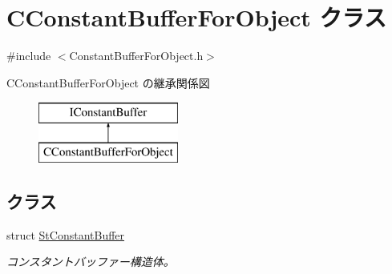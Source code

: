 \hypertarget{class_c_constant_buffer_for_object}{}\section{C\+Constant\+Buffer\+For\+Object クラス}
\label{class_c_constant_buffer_for_object}


{\ttfamily \#include $<$Constant\+Buffer\+For\+Object.\+h$>$}

C\+Constant\+Buffer\+For\+Object の継承関係図\begin{figure}[H]
\begin{center}
\leavevmode
\includegraphics[height=2.000000cm]{class_c_constant_buffer_for_object}
\end{center}
\end{figure}
\subsection*{クラス}
\begin{DoxyCompactItemize}
\item 
struct \hyperlink{struct_c_constant_buffer_for_object_1_1_st_constant_buffer}{St\+Constant\+Buffer}
\begin{DoxyCompactList}\small\item\em コンスタントバッファー構造体。 \end{DoxyCompactList}\end{DoxyCompactItemize}
